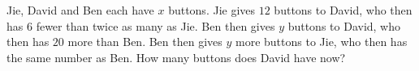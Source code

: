 Jie, David and Ben each have $x$ buttons. Jie gives $12$ buttons to David, who then has $6$ fewer than twice as many as Jie. Ben then gives $y$ buttons to David, who then has $20$ more than Ben. Ben then gives $y$ more buttons to Jie, who then has the same number as Ben. How many buttons does David have now?
